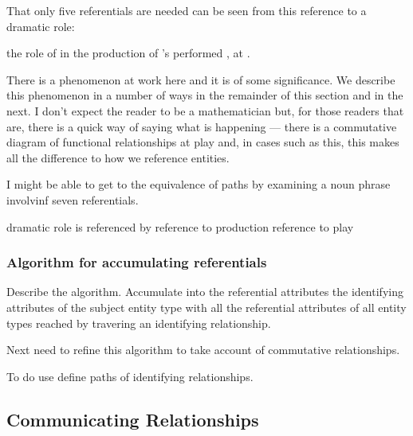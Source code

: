 That only five referentials are needed can be seen from this reference to a dramatic role:
\begin{erquote}
\parbox{9.0cm}{the role of  in the production of \mbox{'s}  performed \mbox{,} at .
}
\end{erquote}

There is a phenomenon at work here and it is of some significance. 
We describe this phenomenon in a number of ways in the remainder of this section and in the next. 
I don't expect the reader to be a mathematician but, for those readers that are, there is a quick way of saying what is happening --- there is a commutative diagram of functional relationships at play and, in cases such as this, this makes all the difference to how we reference entities.

\begin{noteforfuture}
I might be able to get to the equivalence of paths by examining
a noun phrase involvinf seven referentials.

dramatic role is referenced by reference to production reference to play
\end{noteforfuture}

\subsubsection{Algorithm for accumulating referentials}

Describe the algorithm.
Accumulate into the referential attributes the identifying attributes of the subject entity type
with all the referential attributes of all entity types reached by travering an identifying relationship.

Next need to refine this algorithm to take account of commutative relationships. 

To do use define paths of identifying relationships.

\subsection{Communicating Relationships}

